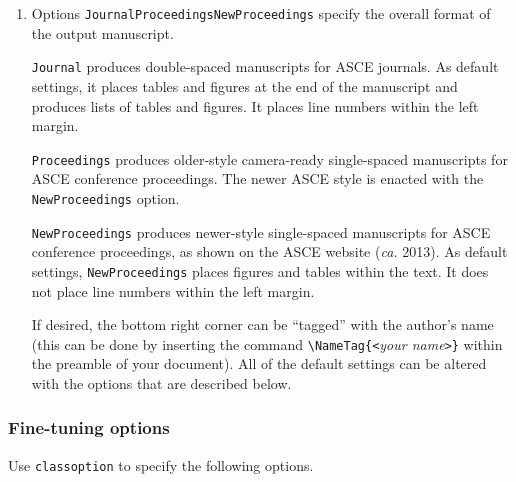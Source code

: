 \documentclass[NewProceedings, InsideFigs,LineNumbers]{asce-quarto}
\begin{document}
\begin{enumerate}
\def\labelenumi{\arabic{enumi}.}
\item
  Options \texttt{Journal\textbar{}Proceedings\textbar{}NewProceedings}
  specify the overall format of the output manuscript.

  \texttt{Journal} produces double-spaced manuscripts for ASCE journals.
  As default settings, it places tables and figures at the end of the
  manuscript and produces lists of tables and figures. It places line
  numbers within the left margin.

  \texttt{Proceedings} produces older-style camera-ready single-spaced
  manuscripts for ASCE conference proceedings. The newer ASCE style is
  enacted with the \texttt{NewProceedings} option.

  \texttt{NewProceedings} produces newer-style single-spaced manuscripts
  for ASCE conference proceedings, as shown on the ASCE website
  (\emph{ca.} 2013). As default settings, \texttt{NewProceedings} places
  figures and tables within the text. It does not place line numbers
  within the left margin.

  If desired, the bottom right corner can be ``tagged'' with the
  author's name (this can be done by inserting the command
  \texttt{\textbackslash{}NameTag\{\textless{}}\emph{your
  name}\texttt{\textgreater{}\}} within the preamble of your document).
  All of the default settings can be altered with the options that are
  described below.
\end{enumerate}

\subsubsection{Fine-tuning options}\label{fine-tuning-options}

Use \texttt{classoption} to specify the following options.
\end{document}
